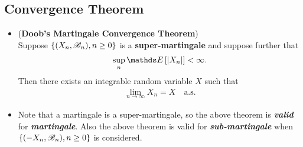 \documentclass[11pt]{article}
\begin{document}
\subsection{Convergence Theorem}
\begin{itemize}
\item \begin{theorem}(\textbf{Doob's Martingale Convergence Theorem}) \citep{billingsley2008probability}\\
Suppose $\left\{(X_n, {\mathscr B}_n), n \ge 0\right\}$ is a \textbf{super-martingale} and suppose further that
\begin{align*}
\sup_{n}\E{}{\abs{X_n}} < \infty.
\end{align*} Then there exists an integrable random variable $X$ such that 
\begin{align*}
\lim\limits_{n \to \infty}X_n = X \quad \text{a.s.}
\end{align*}
\end{theorem}

\item \begin{remark}
Note that a martingale is a super-martingale, so the above theorem is \emph{\textbf{valid}} for \emph{\textbf{martingale}}. Also the above theorem is valid for \emph{\textbf{sub-martingale}} when $\left\{(-X_n, {\mathscr B}_n), n \ge 0\right\}$ is considered.
\end{remark}
\end{itemize}


\newpage


\end{document}
